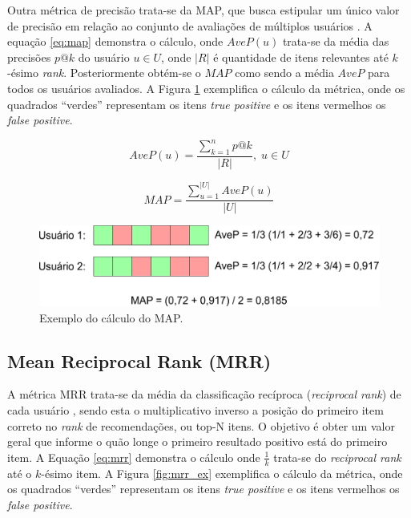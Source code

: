 Outra métrica de precisão trata-se da \ac{MAP}, que busca estipular um único valor de precisão em relação ao conjunto de avaliações de múltiplos usuários \citep{Manning:2008}. A equação \ref{eq:map} demonstra o cálculo, onde $AveP(u)$ trata-se da média das precisões $p@k$ do usuário $u \in U$, onde $|R|$ é quantidade de itens relevantes até $k$-ésimo \textit{rank}. Posteriormente obtém-se o $MAP$ como sendo a média $AveP$ para todos os usuários avaliados. A Figura \ref{fig:map_ex} exemplifica o cálculo da métrica, onde os quadrados \enquote{verdes} representam os itens \textit{true positive} e os itens vermelhos os \textit{false positive}.

\begin{equation}
	AveP(u) = \frac{\sum_{k=1}^{n} p@k}{|R|}, \; u \in U
\label{eq:avep}
\end{equation}

\begin{equation}
	MAP = \frac{\sum_{u=1}^{|U|}AveP(u)}{|U|}
\label{eq:map}
\end{equation}

\begin{figure}
	\centering
	\includegraphics[scale=0.4]{imagens/map_ex.jpg}
	\caption{Exemplo do cálculo do MAP.}
	\label{fig:map_ex}
\end{figure}

\subsection{Mean Reciprocal Rank (MRR)}

A métrica \ac{MRR} trata-se da média da classificação recíproca (\textit{reciprocal rank}) de cada usuário \citep{Burges:2006}, sendo esta o multiplicativo inverso a posição do primeiro item correto no \textit{rank} de recomendações, ou top-N itens. O objetivo é obter um valor geral que informe o quão longe o primeiro resultado positivo está do primeiro item. A Equação \ref{eq:mrr} demonstra o cálculo onde $\frac{1}{k}$ trata-se do \textit{reciprocal rank} até o $k$-ésimo item. A Figura \ref{fig:mrr_ex} exemplifica o cálculo da métrica, onde os quadrados \enquote{verdes} representam os itens \textit{true positive} e os itens vermelhos os \textit{false positive}.

